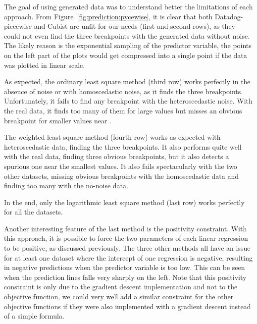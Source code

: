                 The goal of using generated data was to understand better the limitations of each approach. From
                Figure~\ref{fig:prediction:pycewise}, it is clear that both Datadog-piecewise and Cubist are unfit for
                our needs (first and second rows), as they could not even find the three breakpoints with the generated
                data without noise. The likely reason is the exponential sampling of the predictor variable, the points
                on the left part of the plots would get compressed into a single point if the data was plotted in linear
                scale.

                As expected, the ordinary least square method (third row) works perfectly in the absence of noise or
                with homoscedastic noise, as it finds the three breakpoints. Unfortunately, it fails to find any
                breakpoint with the heteroscedastic noise. With the real data, it finds too many of them for large
                values but misses an obvious breakpoint for smaller values near .

                The weighted least square method (fourth row) works as expected with heteroscedastic data, finding the
                three breakpoints. It also performs quite well with the real data, finding three obvious breakpoints,
                but it also detects a spurious one near the smallest values. It also fails spectacularly with the two
                other datasets, missing obvious breakpoints with the homoscedastic data and finding too many with the
                no-noise data.

                In the end, only the logarithmic least square method (last row) works perfectly for all the datasets.

                Another interesting feature of the last method is the positivity constraint. With this approach, it is
                possible to force the two parameters of each linear regression to be positive, as discussed previously.
                The three other methods all have an issue for at least one dataset where the intercept of one regression
                is negative, resulting in negative predictions when the predictor variable is too low. This can be seen
                when the prediction lines falls very sharply on the left. Note that this positivity constraint is only
                due to the gradient descent implementation and not to the objective function, we could very well
                add a similar constraint for the other objective functions if they were also implemented with a gradient
                descent instead of a simple formula.

